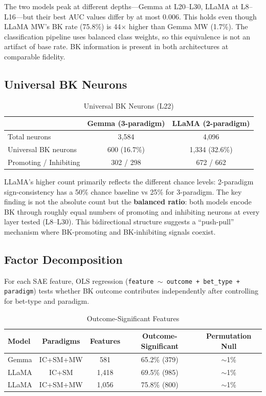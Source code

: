 \documentclass[11pt,a4paper]{article}
\begin{document}
The two models peak at different depths---Gemma at L20--L30, LLaMA at L8--L16---but their best AUC values differ by at most 0.006. This holds even though LLaMA MW's BK rate (75.8\%) is 44$\times$ higher than Gemma MW (1.7\%). The classification pipeline uses balanced class weights, so this equivalence is not an artifact of base rate. BK information is present in both architectures at comparable fidelity.

\subsection{Universal BK Neurons}

\begin{table}[H]
\centering
\caption{Universal BK Neurons (L22)}
\begin{tabular}{lcc}
\toprule
 & \textbf{Gemma (3-paradigm)} & \textbf{LLaMA (2-paradigm)} \\
\midrule
Total neurons & 3{,}584 & 4{,}096 \\
Universal BK neurons & 600 (16.7\%) & 1{,}334 (32.6\%) \\
Promoting / Inhibiting & 302 / 298 & 672 / 662 \\
\bottomrule
\end{tabular}
\end{table}

LLaMA's higher count primarily reflects the different chance levels: 2-paradigm sign-consistency has a 50\% chance baseline vs 25\% for 3-paradigm. The key finding is not the absolute count but the \textbf{balanced ratio}: both models encode BK through roughly equal numbers of promoting and inhibiting neurons at every layer tested (L8--L30). This bidirectional structure suggests a ``push-pull'' mechanism where BK-promoting and BK-inhibiting signals coexist.

\subsection{Factor Decomposition}

For each SAE feature, OLS regression (\texttt{feature $\sim$ outcome + bet\_type + paradigm}) tests whether BK outcome contributes independently after controlling for bet-type and paradigm.

\begin{table}[H]
\centering
\caption{Outcome-Significant Features}
\begin{tabular}{lcccc}
\toprule
\textbf{Model} & \textbf{Paradigms} & \textbf{Features} & \textbf{Outcome-Significant} & \textbf{Permutation Null} \\
\midrule
Gemma & IC+SM+MW & 581 & 65.2\% (379) & ${\sim}$1\% \\
LLaMA & IC+SM & 1{,}418 & 69.5\% (985) & ${\sim}$1\% \\
LLaMA & IC+SM+MW & 1{,}056 & 75.8\% (800) & ${\sim}$1\% \\
\bottomrule
\end{tabular}
\end{table}
\end{document}
